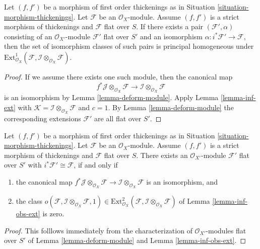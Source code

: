 \begin{lemma}
\label{lemma-inf-ext-rel}
Let $(f, f')$ be a morphism of first order thickenings as in
Situation \ref{situation-morphism-thickenings}.
Let $\mathcal{F}$ be an $\mathcal{O}_X$-module.
Assume $(f, f')$ is a strict morphism of thickenings and
$\mathcal{F}$ flat over $S$. If there exists a pair
$(\mathcal{F}', \alpha)$ consisting of an
$\mathcal{O}_{X'}$-module $\mathcal{F}'$ flat over $S'$ and an isomorphism
$\alpha : i^*\mathcal{F}' \to \mathcal{F}$, then the set of
isomorphism classes of such pairs is principal homogeneous
under
$\text{Ext}^1_{\mathcal{O}_X}(
\mathcal{F}, \mathcal{I} \otimes_{\mathcal{O}_X} \mathcal{F})$.
\end{lemma}

\begin{proof}
If we assume there exists one such module, then the canonical map
$$
f^*\mathcal{J} \otimes_{\mathcal{O}_X} \mathcal{F} \to
\mathcal{I} \otimes_{\mathcal{O}_X} \mathcal{F}
$$
is an isomorphism by Lemma \ref{lemma-deform-module}. Apply
Lemma \ref{lemma-inf-ext} with $\mathcal{K} = 
\mathcal{I} \otimes_{\mathcal{O}_X} \mathcal{F}$
and $c = 1$. By Lemma \ref{lemma-deform-module} the corresponding extensions
$\mathcal{F}'$ are all flat over $S'$.
\end{proof}

\begin{lemma}
\label{lemma-inf-obs-ext-rel}
Let $(f, f')$ be a morphism of first order thickenings as in
Situation \ref{situation-morphism-thickenings}.
Let $\mathcal{F}$ be an $\mathcal{O}_X$-module. Assume
$(f, f')$ is a strict morphism of thickenings
and $\mathcal{F}$ flat over $S$. There exists an
$\mathcal{O}_{X'}$-module $\mathcal{F}'$ flat over $S'$ with
$i^*\mathcal{F}' \cong \mathcal{F}$, if and only if
\begin{enumerate}
\item the canonical map $
f^*\mathcal{J} \otimes_{\mathcal{O}_X} \mathcal{F} \to
\mathcal{I} \otimes_{\mathcal{O}_X} \mathcal{F}$
is an isomorphism, and
\item the class
$o(\mathcal{F}, \mathcal{I} \otimes_{\mathcal{O}_X} \mathcal{F}, 1)
\in \text{Ext}^2_{\mathcal{O}_X}(
\mathcal{F}, \mathcal{I} \otimes_{\mathcal{O}_X} \mathcal{F})$
of Lemma \ref{lemma-inf-obs-ext} is zero.
\end{enumerate}
\end{lemma}

\begin{proof}
This folllows immediately from the characterization of
$\mathcal{O}_{X'}$-modules flat over $S'$ of 
Lemma \ref{lemma-deform-module} and
Lemma \ref{lemma-inf-obs-ext}.
\end{proof}






